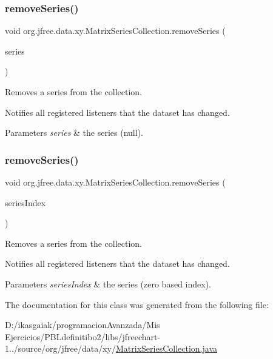 \subsubsection{\texorpdfstring{remove\+Series()}{removeSeries()}\hspace{0.1cm}{\footnotesize\ttfamily [1/2]}}
{\footnotesize\ttfamily void org.\+jfree.\+data.\+xy.\+Matrix\+Series\+Collection.\+remove\+Series (\begin{DoxyParamCaption}\item[{\mbox{\hyperlink{classorg_1_1jfree_1_1data_1_1xy_1_1_matrix_series}{Matrix\+Series}}}]{series }\end{DoxyParamCaption})}

Removes a series from the collection. 

Notifies all registered listeners that the dataset has changed. 


\begin{DoxyParams}{Parameters}
{\em series} & the series ({\ttfamily null}). \\
\hline
\end{DoxyParams}
\mbox{\label{classorg_1_1jfree_1_1data_1_1xy_1_1_matrix_series_collection_a097285e62924d5fd363e354430c0d6b9}} 
\subsubsection{\texorpdfstring{remove\+Series()}{removeSeries()}\hspace{0.1cm}{\footnotesize\ttfamily [2/2]}}
{\footnotesize\ttfamily void org.\+jfree.\+data.\+xy.\+Matrix\+Series\+Collection.\+remove\+Series (\begin{DoxyParamCaption}\item[{int}]{series\+Index }\end{DoxyParamCaption})}

Removes a series from the collection. 

Notifies all registered listeners that the dataset has changed.


\begin{DoxyParams}{Parameters}
{\em series\+Index} & the series (zero based index). \\
\hline
\end{DoxyParams}


The documentation for this class was generated from the following file\+:\begin{DoxyCompactItemize}
\item 
D\+:/ikasgaiak/programacion\+Avanzada/\+Mis Ejercicios/\+P\+B\+Ldefinitibo2/libs/jfreechart-\/1../source/org/jfree/data/xy/\mbox{\hyperlink{_matrix_series_collection_8java}{Matrix\+Series\+Collection.\+java}}\end{DoxyCompactItemize}
